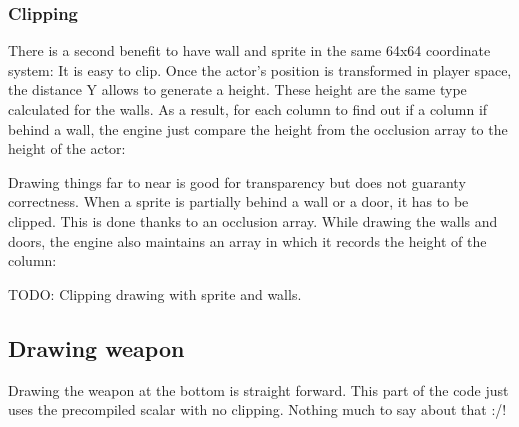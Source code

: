 \subsubsection{Clipping}
There is a second benefit to have wall and sprite in the same 64x64 coordinate system: It is easy to clip. Once the actor's position is transformed in player space, the distance Y allows to generate a height. These height are the same type calculated for the walls. As a result, for each column to find out if a column if behind a wall, the engine just compare the height from the occlusion array to the height of the actor:\\
\par
Drawing things far to near is good for transparency but does not guaranty correctness. When a sprite is partially behind a wall or a door, it has to be clipped. This is done thanks to an occlusion array. While drawing the walls and doors, the engine also maintains an array in which it records the height of the column:\\
\par
\begin{minipage}{\textwidth}

\end{minipage}
\begin{minipage}{\textwidth}

\end{minipage}
\begin{minipage}{\textwidth}

\end{minipage}
\par
TODO: Clipping drawing with sprite and walls.\\
















\subsection{Drawing weapon}
Drawing the weapon at the bottom is straight forward. This part of the code just uses the precompiled scalar with no clipping. Nothing much to say about that :/!\\


















